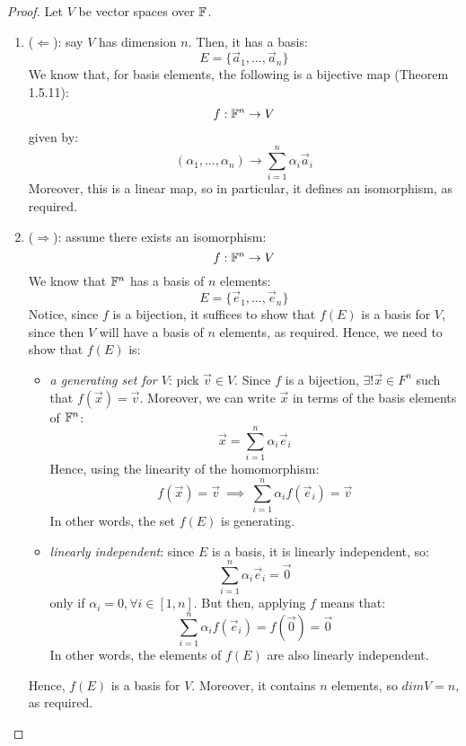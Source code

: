 \documentclass{exam}
\begin{document}
\begin{proof}

Let $V$ be vector spaces over $\mathbb{F}$.

\begin{enumerate}
    \item ($\Longleftarrow$): say $V$ has dimension $n$. Then, it has a basis:
    \[
    E = \{\vec{a}_1, \ldots, \vec{a}_n\}
    \]
    We know that, for basis elements, the following is a bijective map (Theorem 1.5.11):
    \[
    f : \mathbb{F}^n \to V
    \]
    given by:
    \[
    (\alpha_1, \ldots, \alpha_n) \to \sum_{i = 1}^n \alpha_i\vec{a}_i
    \]
    Moreover, this is a linear map, so in particular, it defines an isomorphism, as required.
    \item ($\Longrightarrow$): assume there exists an isomorphism:
    \[
    f: \mathbb{F}^n \to V
    \]
    We know that $\mathbb{F}^n$ has a basis of $n$ elements:
    \[
    E = \{\vec{e}_1, \ldots, \vec{e}_n\}
    \]
    Notice, since $f$ is a bijection, it suffices to show that $f(E)$ is a basis for $V$, since then $V$ will have a basis of $n$ elements, as required. Hence, we need to show that $f(E)$ is:
    \begin{itemize}
        \item \textit{a generating set for $V$}: pick $\vec{v} \in V$. Since $f$ is a bijection, $\exists ! \vec{x} \in F^n$ such that $f(\vec{x}) = \vec{v}$. Moreover, we can write $\vec{x}$ in terms of the basis elements of $\mathbb{F}^n$:
        \[
        \vec{x} = \sum_{i = 1}^n \alpha_i\vec{e}_i
        \]
        Hence, using the linearity of the homomorphism:
        \[
        f(\vec{x}) = \vec{v} \ \implies \ \sum_{i = 1}^n \alpha_if(\vec{e}_i) = \vec{v}
        \]
        In other words, the set $f(E)$ is generating.
        \item \textit{linearly independent}: since $E$ is a basis, it is linearly independent, so:
        \[
        \sum_{i = 1}^n \alpha_i\vec{e}_i = \vec{0}
        \]
        only if $\alpha_i = 0, \forall i \in [1,n]$. But then, applying $f$ means that:
        \[
        \sum_{i = 1}^n \alpha_if(\vec{e}_i) = f(\vec{0}) = \vec{0}
        \]
        In other words, the elements of $f(E)$ are also linearly independent.
    \end{itemize}
    Hence, $f(E)$ is a basis for $V$. Moreover, it contains $n$ elements, so $dim V = n$, as required.
\end{enumerate}

\end{proof}
\end{document}
